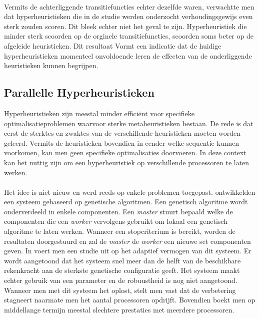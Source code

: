 \paragraph{}
Vermits de achterliggende transitiefuncties echter dezelfde waren, verwachtte men dat hyperheuristieken die in de studie werden onderzocht verhoudingsgewijs even sterk zouden scoren. Dit bleek echter niet het geval te zijn. Hyperheuristiek die minder sterk scoorden op de orginele transitiefuncties, scoorden soms beter op de afgeleide heuristieken. Dit resultaat Vormt een indicatie dat de huidige hyperheuristieken momenteel onvoldoende leren de effecten van de onderliggende heuristieken kunnen begrijpen.

\subsection{Parallelle Hyperheuristieken}

Hyperheuristieken zijn meestal minder effici\"ent voor specifieke optimalisatieproblemen waarvoor sterke metaheuristieken bestaan. De rede is dat eerst de sterktes en zwaktes van de verschillende heuristieken moeten worden geleerd. Vermits de heuristieken bovendien in eender welke sequentie kunnen voorkomen, kan men geen specifieke optimalisaties doorvoeren. In deze context kan het nuttig zijn om een hyperheuristiek op verschillende processoren te laten werken.

\paragraph{}
Het idee is niet nieuw en werd reeds op enkele problemen toegepast. \cite{conf/gecco/LeonMS08,conf/pdp/SeguraSL12} ontwikkelden een systeem gebaseerd op genetische algoritmen. Een genetisch algoritme wordt onderverdeeld in enkele componenten. Een \emph{master} stuurt bepaald welke de componenten die een \emph{worker} vervolgens gebruikt om lokaal een genetisch algoritme te laten werken. Wanneer een stopcriterium is bereikt, worden de resultaten doorgestuurd en zal de \emph{master} de \emph{worker} een nieuwe set componenten geven. In \cite{conf/pdp/SeguraSL12} voert men een studie uit op het adaptief vermogen van dit systeem. Er wordt aangetoond dat het systeem snel meer dan de helft van de beschikbare rekenkracht aan de sterkste genetische configuratie geeft. Het systeem maakt echter gebruik van een parameter en de robuustheid is nog niet aangetoond. Wanneer men met dit systeem het  oplost, stelt men vast dat de verbetering stagneert naarmate men het aantal processoren opdrijft. Bovendien boekt men op middellange termijn meestal slechtere prestaties met meerdere processoren.

